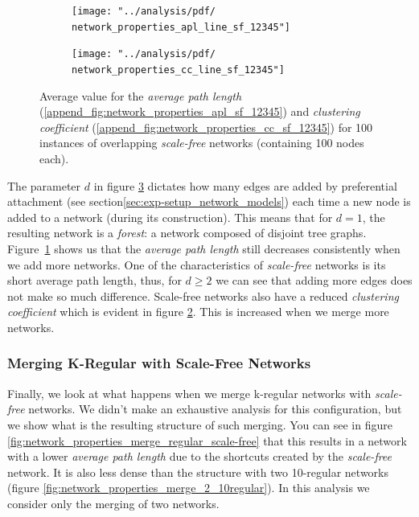 \documentclass[preprint,number]{elsarticle}
\begin{document}
\begin{figure}[H]
	\centering
	\begin{subfigure}{.5\linewidth}
		\centering
		\texttt{[image: "../analysis/pdf/ network\_properties\_apl\_line\_sf\_12345"]}
		\caption{}
		\label{fig:network_properties_apl_line_sf_12345}
	\end{subfigure}%
	\begin{subfigure}{.5\linewidth}
		\centering
		\texttt{[image: "../analysis/pdf/ network\_properties\_cc\_line\_sf\_12345"]}
		\caption{}
		\label{fig:network_properties_cc_line_sf_12345}
	\end{subfigure}
	\begin{minipage}{0.9\textwidth}
		\vspace{0.2cm}
		\caption{Average value for the \textit{average path length} (\ref{append_fig:network_properties_apl_sf_12345}) and \textit{clustering coefficient} (\ref{append_fig:network_properties_cc_sf_12345}) for 100 instances of overlapping \textit{scale-free} networks (containing 100 nodes each).}
		\label{fig:network_properties_line_sf}
	\end{minipage}
\end{figure}

The parameter $d$ in figure \ref{fig:network_properties_line_sf} dictates how many edges are added by preferential attachment (see section\ref{sec:exp-setup_network_models}) each time a new node is added to a network (during its construction). This means that for $d=1$, the resulting network is a \textit{forest}: a network composed of disjoint tree graphs. Figure~\ref{fig:network_properties_apl_line_sf_12345} shows us that the \textit{average path length} still decreases consistently when we add more networks. One of the characteristics of \textit{scale-free} networks is its short average  path length, thus, for $d \ge 2$ we can see that adding more edges does not make so much difference. Scale-free networks also have a reduced \textit{clustering coefficient} which is evident in figure \ref{fig:network_properties_cc_line_sf_12345}. This is increased when we merge more networks.


\subsubsection{Merging K-Regular with Scale-Free Networks}
Finally, we look at what happens when we merge k-regular networks with \textit{scale-free} networks. We didn't make an exhaustive analysis for this configuration, but we show what is the resulting structure of such merging. You can see in figure \ref{fig:network_properties_merge_regular_scale-free} that this results in a network with a lower \textit{average path length} due to the shortcuts created by the \textit{scale-free} network. It is also less dense than the structure with two 10-regular networks (figure \ref{fig:network_properties_merge_2_10regular}). In this analysis we consider only the merging of two networks.
\end{document}
